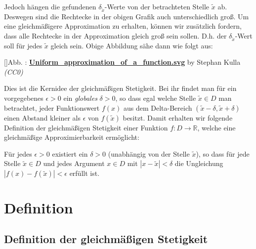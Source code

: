 \documentclass[fontsize=9pt,
               parskip=half-,
               DIV=14,
               listof=chapterentry,
               tocflat]{scrbook}
\newcounter{imagelabel}
\begin{document}
Jedoch hängen die gefundenen $\delta _{\tilde {x}}$-Werte von der betrachteten Stelle ${\tilde {x}}$ ab. Deswegen sind die Rechtecke in der obigen Grafik auch unterschiedlich groß. Um eine gleichmäßigere Approximation zu erhalten, können wir zusätzlich fordern, dass alle Rechtecke in der Approximation gleich groß sein sollen. D.h. der $\delta _{\tilde {x}}$-Wert soll für jedes ${\tilde {x}}$ gleich sein. Obige Abbildung sähe dann wie folgt aus:

[]{Abb. : \protect\href{https://commons.wikimedia.org/wiki/File:Uniform_approximation_of_a_function.svg}{\textbf{Uniform\allowbreak\_approximation\allowbreak\_of\allowbreak\_a\allowbreak\_function.svg}} by Stephan Kulla \textit{(CC0)}}\begin{center}
\end{center}

Dies ist die Kernidee der gleichmäßigen Stetigkeit. Bei ihr findet man für ein vorgegebenes $\epsilon >0$ ein \emph{globales} $\delta >0$, so dass egal welche Stelle ${\tilde {x}}\in D$ man betrachtet, jeder Funktionswert $f(x)$ aus dem Delta-Bereich $({\tilde {x}}-\delta ,{\tilde {x}}+\delta )$ einen Abstand kleiner als $\epsilon $ von $f({\tilde {x}})$ besitzt. Damit erhalten wir folgende Definition der gleichmäßigen Stetigkeit einer Funktion $f:D\to \mathbb {R} $, welche eine gleichmäßige Approximierbarkeit ermöglicht:

\begin{importantparagraph*}
Für jedes $\epsilon >0$ existiert ein $\delta >0$ (unabhängig von der Stelle ${\tilde {x}}$), so dass für jede Stelle ${\tilde {x}}\in D$ und jedes Argument $x\in D$ mit $|x-{\tilde {x}}|<\delta $ die Ungleichung $|f(x)-f({\tilde {x}})|<\epsilon $ erfüllt ist.

\end{importantparagraph*}

\section{Definition}

\subsection{Definition der gleichmäßigen Stetigkeit}
\end{document}

